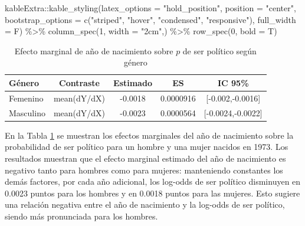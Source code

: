 \documentclass[
  12pt,
  a4paper,
]{article}
\newenvironment{Shaded}{\begin{snugshade}}{\end{snugshade}}
\newcommand{\AttributeTok}[1]{\textcolor[rgb]{0.77,0.63,0.00}{#1}}
\newcommand{\DecValTok}[1]{\textcolor[rgb]{0.00,0.00,0.81}{#1}}
\newcommand{\FunctionTok}[1]{\textcolor[rgb]{0.00,0.00,0.00}{#1}}
\newcommand{\NormalTok}[1]{#1}
\newcommand{\SpecialCharTok}[1]{\textcolor[rgb]{0.00,0.00,0.00}{#1}}
\newcommand{\StringTok}[1]{\textcolor[rgb]{0.31,0.60,0.02}{#1}}
\begin{document}
\begin{Shaded}
\begin{Highlighting}[]
\NormalTok{  kableExtra}\SpecialCharTok{::}\FunctionTok{kable\_styling}\NormalTok{(}\AttributeTok{latex\_options =} \StringTok{"hold\_position"}\NormalTok{, }
                            \AttributeTok{position =} \StringTok{"center"}\NormalTok{, }
                            \AttributeTok{bootstrap\_options =} \FunctionTok{c}\NormalTok{(}\StringTok{"striped"}\NormalTok{, }\StringTok{"hover"}\NormalTok{, }
                                                  \StringTok{"condensed"}\NormalTok{, }\StringTok{"responsive"}\NormalTok{), }
                            \AttributeTok{full\_width =}\NormalTok{ F) }\SpecialCharTok{\%\textgreater{}\%} 
  \FunctionTok{column\_spec}\NormalTok{(}\DecValTok{1}\NormalTok{, }\AttributeTok{width =} \StringTok{"2cm"}\NormalTok{,) }\SpecialCharTok{\%\textgreater{}\%}
  \FunctionTok{row\_spec}\NormalTok{(}\DecValTok{0}\NormalTok{, }\AttributeTok{bold =}\NormalTok{ T)}
\end{Highlighting}
\end{Shaded}

\begin{table}[!h]

\caption{\label{tab:table4}\label{tab:table4} Efecto marginal de año de nacimiento sobre $p$ 
                                    de ser político según género}
\centering
\begin{tabular}[t]{>{\centering\arraybackslash}p{2cm}cccc}
\toprule
\textbf{Género} & \textbf{Contraste} & \textbf{Estimado} & \textbf{ES} & \textbf{IC 95\%}\\
\midrule
Femenino & mean(dY/dX) & -0.0018 & 0.0000916 & {}[-0.002,-0.0016]\\
Masculino & mean(dY/dX) & -0.0023 & 0.0000564 & {}[-0.0024,-0.0022]\\
\bottomrule
\end{tabular}
\end{table}

En la Tabla \ref{tab:table4} se muestran los efectos marginales del año de nacimiento sobre la probabilidad de ser político para un hombre y una mujer nacidos en 1973. Los resultados muestran que el efecto marginal estimado del año de nacimiento es negativo tanto para hombres como para mujeres: manteniendo constantes los demás factores, por cada año adicional, los log-odds de ser político disminuyen en 0.0023 puntos para los hombres y en 0.0018 puntos para las mujeres. Esto sugiere una relación negativa entre el año de nacimiento y la log-odds de ser político, siendo más pronunciada para los hombres.
\end{document}
